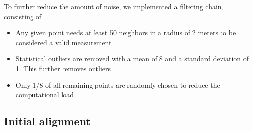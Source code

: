 \documentclass[10pt,twocolumn,letterpaper]{article}
\begin{document}
To further reduce the amount of noise, we implemented a filtering chain, consisting of 

\begin{itemize}
   \item Any given point needs at least 50 neighbors in a radius of 2 meters to be considered a valid measurement
   \item Statistical outliers are removed with a mean of 8 and a standard deviation of 1. This further removes outliers
   \item Only 1/8 of all remaining points are randomly chosen to reduce the computational load
\end{itemize}

\subsection{Initial alignment}
\end{document}
